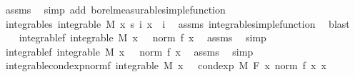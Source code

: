 \begin{isabellebody}
\ assms{\isacharparenleft}{\kern0pt}{}{\isacharparenright}{\kern0pt}\ \isamarkupfalse%
\ {\isacharparenleft}{\kern0pt}simp\ add{\isacharcolon}{\kern0pt}\ borel{\isacharunderscore}{\kern0pt}measurable{\isacharunderscore}{\kern0pt}simple{\isacharunderscore}{\kern0pt}function{\isacharparenright}{\kern0pt}\isanewline
\ \ \isamarkupfalse%
\ integrable{\isacharunderscore}{\kern0pt}s{\isacharcolon}{\kern0pt}\ {\isachardoublequoteopen}integrable\ M\ {\isacharparenleft}{\kern0pt}{\isasymlambda}x{\isachardot}{\kern0pt}\ s\ i\ x{\isacharparenright}{\kern0pt}{\isachardoublequoteclose}\ \ i\ \isamarkupfalse%
\ assms\ integrable{\isacharunderscore}{\kern0pt}simple{\isacharunderscore}{\kern0pt}function\ \isamarkupfalse%
\ blast\isanewline
\ \ \isamarkupfalse%
\ integrable{\isacharunderscore}{\kern0pt}{}f{\isacharcolon}{\kern0pt}\ {\isachardoublequoteopen}integrable\ M\ {\isacharparenleft}{\kern0pt}{\isasymlambda}x{\isachardot}{\kern0pt}\ {}\ {\isacharasterisk}{\kern0pt}\ norm\ {\isacharparenleft}{\kern0pt}f\ x{\isacharparenright}{\kern0pt}{\isacharparenright}{\kern0pt}{\isachardoublequoteclose}\ \isamarkupfalse%
\ assms{\isacharparenleft}{\kern0pt}{}{\isacharparenright}{\kern0pt}\ \isamarkupfalse%
\ simp\isanewline
\ \ \isamarkupfalse%
\ integrable{\isacharunderscore}{\kern0pt}{}f{\isacharcolon}{\kern0pt}\ {\isachardoublequoteopen}integrable\ M\ {\isacharparenleft}{\kern0pt}{\isasymlambda}x{\isachardot}{\kern0pt}\ {}\ {\isacharasterisk}{\kern0pt}\ norm\ {\isacharparenleft}{\kern0pt}f\ x{\isacharparenright}{\kern0pt}{\isacharparenright}{\kern0pt}{\isachardoublequoteclose}\ \isamarkupfalse%
\ assms{\isacharparenleft}{\kern0pt}{}{\isacharparenright}{\kern0pt}\ \isamarkupfalse%
\ simp\isanewline
\ \ \isamarkupfalse%
\ integrable{\isacharunderscore}{\kern0pt}{}{\isacharunderscore}{\kern0pt}cond{\isacharunderscore}{\kern0pt}exp{\isacharunderscore}{\kern0pt}norm{\isacharunderscore}{\kern0pt}f{\isacharcolon}{\kern0pt}\ {\isachardoublequoteopen}integrable\ M\ {\isacharparenleft}{\kern0pt}{\isasymlambda}x{\isachardot}{\kern0pt}\ {}\ {\isacharasterisk}{\kern0pt}\ cond{\isacharunderscore}{\kern0pt}exp\ M\ F\ {\isacharparenleft}{\kern0pt}{\isasymlambda}x{\isachardot}{\kern0pt}\ norm\ {\isacharparenleft}{\kern0pt}f\ x{\isacharparenright}{\kern0pt}{\isacharparenright}{\kern0pt}\ x{\isacharparenright}{\kern0pt}{\isachardoublequoteclose}\ \isamarkupfalse%

\end{isabellebody}
